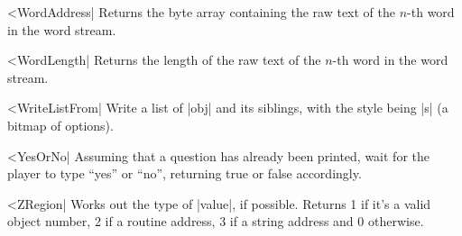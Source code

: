 ^^|WordAddress|
Returns the byte array containing the raw text of the $n$-th
word in the word stream.

^^|WordLength|
Returns the length of the raw text of the $n$-th
word in the word stream.

^^|WriteListFrom|
Write a list of |obj| and its
siblings, with the style being |s| (a bitmap of options).

^^|YesOrNo|
Assuming that a question has already been printed,
wait for the player to type ``yes'' or ``no'', returning true or false
accordingly.

^^|ZRegion|
Works out the type of |value|, if possible.  Returns 1 if it's a valid
object number, 2 if a routine address, 3 if a string address and 0
otherwise.

